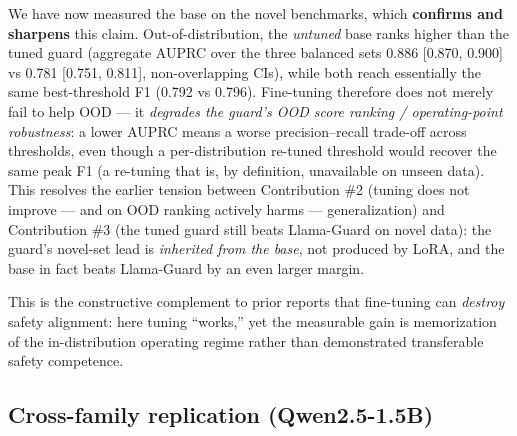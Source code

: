 \documentclass[sigconf,nonacm]{acmart}
\begin{document}
We have now measured the base on the novel benchmarks, which \textbf{confirms and sharpens} this claim. Out-of-distribution, the \emph{untuned} base ranks higher than the tuned guard (aggregate AUPRC over the three balanced sets 0.886 [0.870, 0.900] vs 0.781 [0.751, 0.811], non-overlapping CIs), while both reach essentially the same best-threshold F1 (0.792 vs 0.796). Fine-tuning therefore does not merely fail to help OOD --- it \emph{degrades the guard's OOD score ranking / operating-point robustness}: a lower AUPRC means a worse precision--recall trade-off across thresholds, even though a per-distribution re-tuned threshold would recover the same peak F1 (a re-tuning that is, by definition, unavailable on unseen data). This resolves the earlier tension between Contribution \#2 (tuning does not improve --- and on OOD ranking actively harms --- generalization) and Contribution \#3 (the tuned guard still beats Llama-Guard on novel data): the guard's novel-set lead is \emph{inherited from the base}, not produced by LoRA, and the base in fact beats Llama-Guard by an even larger margin.

This is the constructive complement to prior reports that fine-tuning can \emph{destroy} safety alignment: here tuning ``works,'' yet the measurable gain is memorization of the in-distribution operating regime rather than demonstrated transferable safety competence.

\subsection{Cross-family replication (Qwen2.5-1.5B)}
\label{sec:cross-family}
\end{document}
